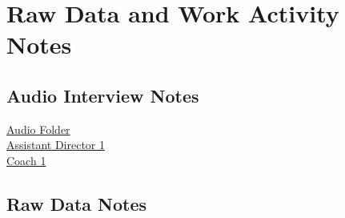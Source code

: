 \documentclass[12pt]{article} %
\begin{document}
\section{Raw Data and Work Activity Notes} %
  \subsection*{Audio Interview Notes} %
  \href{http://www.dropbox.specialorange.com/vt/5714%20UX/}{Audio Folder}\\
    \href{http://www.dropbox.specialorange.com/vt/5714%20UX/ADir1.aac}{Assistant Director 1}\\
    \href{http://www.dropbox.specialorange.com/vt/5714%20UX/C1.aac}{Coach 1}\\

  \subsection*{Raw Data Notes}
  
\end{document}
